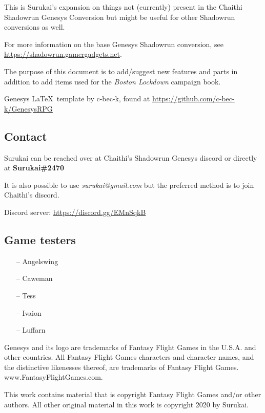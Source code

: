 \documentclass{book}
\begin{document}
\begin{multicols}{2}
This is Surukai's expansion on things not (currently) present in the Chaithi Shadowrun Genesys Conversion but might be useful for other Shadowrun conversions as well.

For more information on the base Genesys Shadowrun conversion, see \url{https://shadowrun.gamergadgets.net}. 

The purpose of this document is to add/suggest new features and parts in addition to add items used for the \textit{Boston Lockdown} campaign book.

Genesys \LaTeX\ template by c-bec-k, found at \url{https://github.com/c-bec-k/GenesysRPG}

\subsection{Contact}
Surukai can be reached over at Chaithi's Shadowrun Genesys discord or directly at \textbf{Surukai\#2470} 

It is also possible to use \textit{surukai@gmail.com} but the preferred method is to join Chaithi's discord. 

Discord server: \url{https://discord.gg/EMnSqkB}

\subsection{Game testers}
\begin{itemize}[noitemsep]
	\item[--] Angelswing
	\item[--] Caweman
	\item[--] Tess
	\item[--] Ivaion
	\item[--] Luffarn
\end{itemize}



\end{multicols}




\vfill

\small Genesys and its logo are trademarks of Fantasy Flight Games in the U.S.A. and other countries. All Fantasy Flight Games characters and character names, and the distinctive likenesses thereof, are trademarks of Fantasy Flight Games. www.FantasyFlightGames.com.

\small This work contains material that is copyright Fantasy Flight Games and/or other authors. All other original material in this work is copyright 2020 by Surukai.
\end{document}
